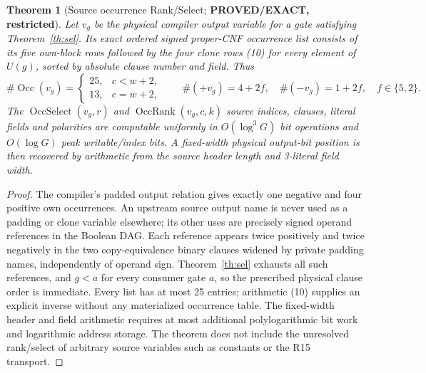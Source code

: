 \documentclass[11pt]{article}
\newtheorem{theorem}{Theorem}
\begin{document}
\begin{theorem}[Source occurrence Rank/Select;
\textbf{PROVED/EXACT, restricted}]\label{th:cnf}
Let $v_g$ be the physical compiler output variable for a
gate satisfying Theorem~\ref{th:sel}.  Its exact ordered
signed proper-CNF occurrence list consists of its five
own-block rows followed by the four clone rows (10)
for every element of $U(g)$, sorted by absolute clause
number and field. Thus
\[
 \#\operatorname{Occ}(v_g)=
 \begin{cases}25,&c<w+2,\\13,&c=w+2,\end{cases}
 \qquad
 \#(+v_g)=4+2f,\quad\#(-v_g)=1+2f,\quad
 f\in\{5,2\}.                                          \tag{11}
\]
The $\operatorname{OccSelect}(v_g,r)$ and
$\operatorname{OccRank}(v_g,c,k)$ source indices, clauses,
literal fields and polarities are computable uniformly
in $O(\log^3G)$ bit operations and $O(\log G)$ peak
writable/index bits. A fixed-width physical output-bit
position is then recovered by arithmetic from the
source header length and 3-literal field width.
\end{theorem}
\begin{proof}
The compiler's padded output relation gives exactly
one negative and four positive own occurrences.
An upstream source output name is never used as a
padding or clone variable elsewhere; its other uses
are precisely signed operand references in the Boolean
DAG. Each reference appears twice positively and twice
negatively in the two copy-equivalence binary clauses
widened by private padding names, independently of
operand sign. Theorem~\ref{th:sel} exhausts all such
references, and $g<a$ for every consumer gate $a$,
so the prescribed physical clause order is immediate.
Every list has at most 25 entries; arithmetic (10)
supplies an explicit inverse without any materialized
occurrence table. The fixed-width header and field
arithmetic requires at most additional polylogarithmic
bit work and logarithmic address storage. The theorem
does not include the unresolved rank/select of arbitrary
source variables such as constants or the R15 transport.
\end{proof}
\end{document}
